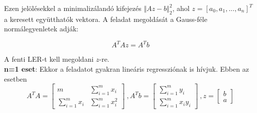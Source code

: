 \documentclass[margin=0px]{article}
\begin{document}
	Ezen jelölésekkel a minimalizálandó kifejezés $\Vert Az - b \Vert_{2}^{2}$, ahol $z = [a_{0},a_{1}, ..., a_{n}]^{T}$
	a keresett együtthatók vektora. A feladat megoldását a Gauss-féle normálegyenletek adják:
	
	\begin{displaymath}
		A^{T}Az = A^{T}b
	\end{displaymath}
	
	\noindent A fenti LER-t kell megoldani $z$-re.\\
	
	\noindent \textbf{n=1 eset}: Ekkor a feladatot gyakran lineáris regressziónak is hívjuk. Ebben az esetben
	\begin{displaymath}
		A^{T}A = \begin{bmatrix}
		m & \sum_{i=1}^{m} x_{i} \\[0.3em]
		\sum_{i=1}^{m} x_{i} & \sum_{i=1}^{m} x_{i}^{2}
		\end{bmatrix} \ ,
		A^{T}b = \begin{bmatrix}
		\sum_{i=1}^{m} y_{i} \\[0.3em]
		\sum_{i=1}^{m} x_{i}y_ {i} 
		\end{bmatrix} \ ,
		z= \begin{bmatrix}
		b \\[0.3em]
		a
		\end{bmatrix}
	\end{displaymath}
	
\end{document}
